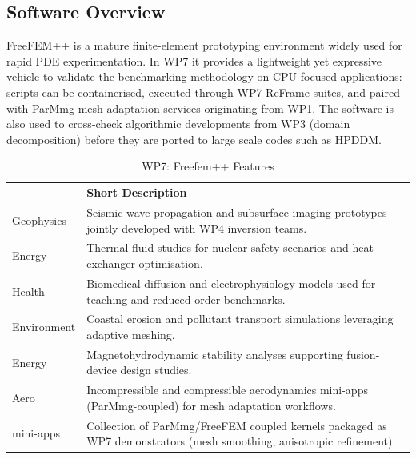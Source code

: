 \subsection{Software Overview}
\label{sec:WP7:Freefem++:summary}

FreeFEM++ is a mature finite-element prototyping environment widely used for rapid PDE experimentation. In WP7 it provides a
lightweight yet expressive vehicle to validate the benchmarking methodology on CPU-focused applications: scripts can be
containerised, executed through WP7 ReFrame suites, and paired with ParMmg mesh-adaptation services originating from WP1. The
software is also used to cross-check algorithmic developments from WP3 (domain decomposition) before they are ported to large
scale codes such as HPDDM.

\begin{table}[h!]
    \centering
    { 
        \setlength{\parindent}{0pt}
        \def\arraystretch{1.25}
        {
            \fontsize{9}{11}\selectfont
            \begin{tabular}{!{\color{numpexgray}\vrule}p{.25\linewidth}!{\color{numpexgray}\vrule}p{.6885\linewidth}!{\color{numpexgray}\vrule}}
    
     &  {\rule{0pt}{2.5ex}\color{white}\bf Short Description }\\ 
    
    Geophysics & Seismic wave propagation and subsurface imaging prototypes jointly developed with WP4 inversion teams. \\
    Energy & Thermal-fluid studies for nuclear safety scenarios and heat exchanger optimisation. \\
    Health & Biomedical diffusion and electrophysiology models used for teaching and reduced-order benchmarks. \\
    Environment & Coastal erosion and pollutant transport simulations leveraging adaptive meshing. \\
    Energy & Magnetohydrodynamic stability analyses supporting fusion-device design studies. \\
    Aero & Incompressible and compressible aerodynamics mini-apps (ParMmg-coupled) for mesh adaptation workflows. \\
    mini-apps & Collection of ParMmg/FreeFEM coupled kernels packaged as WP7 demonstrators (mesh smoothing, anisotropic refinement). \\
\end{tabular}
        }
    }
    \caption{WP7: Freefem++ Features}
\end{table}


